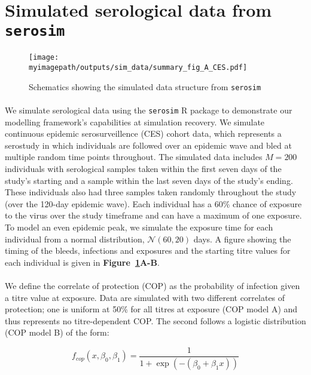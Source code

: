 \section{Simulated serological data from \texttt{serosim}\cite{Menezes2023-ti}}

\begin{figure}[h]
    \centering
    \texttt{[image: \\myimagepath/outputs/sim\_data/summary\_fig\_A\_CES.pdf]}     \caption{Schematics showing the simulated data structure from \texttt{serosim}\cite{Menezes2023-ti}}
    \label{fig:sim_A}
\end{figure}

\paragraph{}We simulate serological data using the \texttt{serosim}\cite{Menezes2023-ti} R package to demonstrate our modelling framework's capabilities at simulation recovery. We simulate continuous epidemic serosurveillence (CES) cohort data, which represents a serostudy in which individuals are followed over an epidemic wave and bled at multiple random time points throughout. The simulated data includes $M = 200$ individuals with serological samples taken within the first seven days of the study's starting and a sample within the last seven days of the study's ending. These individuals also had three samples taken randomly throughout the study (over the 120-day epidemic wave). Each individual has a 60\% chance of exposure to the virus over the study timeframe and can have a maximum of one exposure. To model an even epidemic peak, we simulate the exposure time for each individual from a normal distribution, $\mathcal{N}(60, 20)$ days. A figure showing the timing of the bleeds, infections and exposures and the starting titre values for each individual is given in \textbf{Figure~\ref{fig:sim_A}A-B}.

\paragraph{}We define the correlate of protection (COP) as the probability of infection given a titre value at exposure. Data are simulated with two different correlates of protection; one is uniform at 50\% for all titres at exposure (COP model A) and thus represents no titre-dependent COP. The second follows a logistic distribution (COP model B) of the form:

\begin{equation}
\label{eq_cop}
f_{cop}(x, \beta_0, \beta_1) = \frac{1}{1 + \exp(- (\beta_0 + \beta_1x))}
\end{equation}

